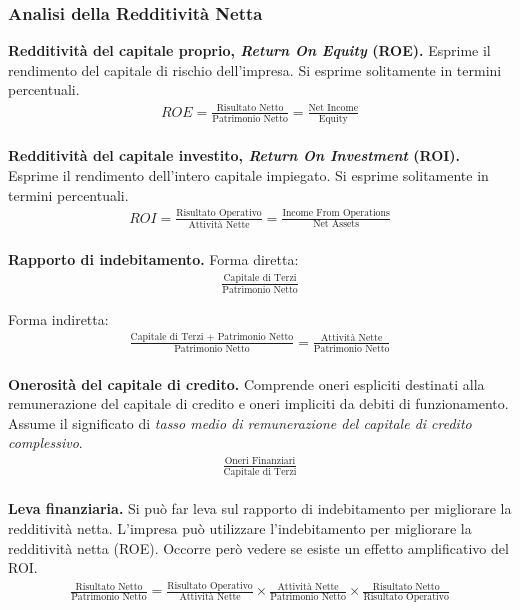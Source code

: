 \documentclass[a4paper,portrait,12pt]{article}
\theoremstyle{definition}
\begin{document}
\subsubsection{Analisi della Redditività Netta}

\textbf{Redditività del capitale proprio, \emph{Return On Equity} (ROE).}
Esprime il rendimento del capitale di rischio dell'impresa.
Si esprime solitamente in termini percentuali.
\begin{align*}
ROE = \frac{\text{Risultato Netto}}{\text{Patrimonio Netto}} = \frac{\text{Net Income}}{\text{Equity}}
\end{align*}\\

\textbf{Redditività del capitale investito, \emph{Return On Investment} (ROI).}
Esprime il rendimento dell'intero capitale impiegato.
Si esprime solitamente in termini percentuali.
\begin{align*}
ROI = \frac{\text{Risultato Operativo}}{\text{Attività Nette}} = \frac{\text{Income From Operations}}{\text{Net Assets}}
\end{align*}\\

\textbf{Rapporto di indebitamento.}
Forma diretta:
\begin{align*}
\frac{\text{Capitale di Terzi}}{\text{Patrimonio Netto}}
\end{align*}

Forma indiretta:
\begin{align*}
\frac{\text{Capitale di Terzi + Patrimonio Netto}}{\text{Patrimonio Netto}} = \frac{\text{Attività Nette}}{\text{Patrimonio Netto}}
\end{align*}\\

\textbf{Onerosità del capitale di credito.}
Comprende oneri espliciti destinati alla remunerazione del capitale di credito e oneri impliciti da debiti di funzionamento.
Assume il significato di \emph{tasso medio di remunerazione del capitale di credito complessivo}.
\begin{align*}
\frac{\text{Oneri Finanziari}}{\text{Capitale di Terzi}}
\end{align*}\\

\textbf{Leva finanziaria.}
Si può far leva sul rapporto di indebitamento per migliorare la redditività netta.
L'impresa può utilizzare l'indebitamento per migliorare la redditività netta (ROE).
Occorre però vedere se esiste un effetto amplificativo del ROI.
\begin{align*}
\frac{\text{Risultato Netto}}{\text{Patrimonio Netto}} = \frac{\text{Risultato Operativo}}{\text{Attività Nette}} \times \frac{\text{Attività Nette}}{\text{Patrimonio Netto}} \times \frac{\text{Risultato Netto}}{\text{Risultato Operativo}}
\end{align*}
\end{document}
